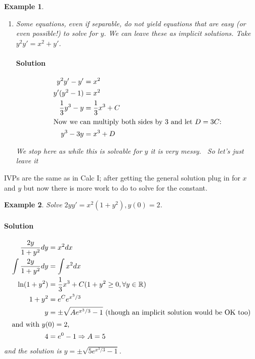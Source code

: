 \documentclass[letterpaper, 11pt, openany]{book}
\theoremstyle{mytheoremstyle}
\theoremstyle{myexamplestyle}
\newtheorem{example}{Example}[section]
\newenvironment{solution}{\paragraph{\sffamily \smaller \fontseries{b}\selectfont Solution}}{\hfill\faSquare}
\begin{document}
\begin{example}
\begin{enumerate}
        \item Some equations, even if separable, do not yield equations that are easy (or even possible!) to solve for \(y\). We can leave these as implicit solutions. Take \(y^2 y' = x^2 + y'\).
        \begin{solution}
            \begin{align*}
                y^2 y' - y' &= x^2 \\
                y'(y^2 - 1) &= x^2 \\
                \frac{1}{3}y^3 - y &= \frac{1}{3} x^3 + C\\
                \intertext{Now we can multiply both sides by 3 and let \(D = 3C\):}
                y^3 - 3y &= x^3 + D
        \end{align*}
        \end{solution}

        We stop here as while this is solvable for \(y\) it is very messy. \faFrown \, So let's just leave it \faSmile
    \end{enumerate}
\end{example}

IVPs are the same as in Calc I; after getting the general solution plug in for \(x\) and \(y\) but now there is more work to do to solve for the constant.

    \begin{example}\label{de-separable-ivp}
        Solve \(2yy' = x^{2}(1 + y^{2}), y(0) = 2\).
            \begin{solution}
                \begin{align*}
                    \frac{2y}{1+y^{2}}dy &= x^{2} dx\\
                    \int \frac{2y}{1+y^{2}}dy &= \int x^{2} dx\\
                    \ln (1 + y^{2}) &= \frac{1}{3} x^{3} + C (1 + y^2 \geq 0 , \forall y \in \mathbb{R}) \\
                    1 + y^{2} &= e^{C} e^{x^{3}/3}\\
                    y &= \pm \sqrt{Ae^{x^{3}/3} - 1} \text{ (though an implicit solution would be OK too)}\\
                    \intertext{and with \(y(0) = 2\),}
                    4 &= e^{0} - 1 \Rightarrow A = 5
                \end{align*}
                and the solution is \(y = \pm \sqrt{5e^{x^{3}/3} - 1}\).
            \end{solution}
    \end{example}
\end{document}
